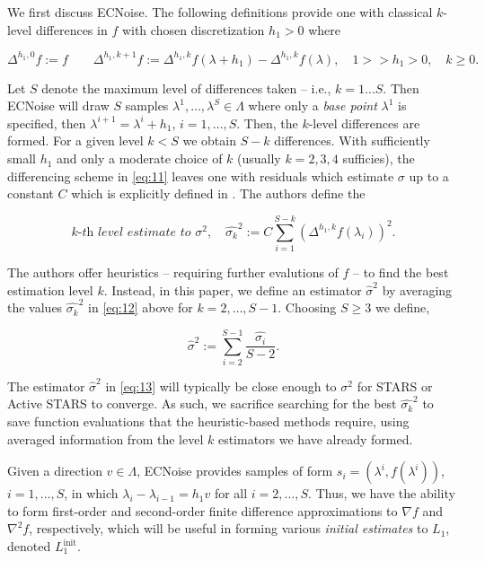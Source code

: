 \documentclass{amsart}
\begin{document}
We first discuss ECNoise. The following definitions provide one with classical $k$-level differences in $f$ with chosen discretization $h_1>0$ where

\begin{equation} \label{eq:13}
\Delta^{h_1,0} f :=f \quad \quad \Delta^{h_1,k+1} f:=\Delta^{h_1,k} f(\lambda+h_1)- \Delta^{h_1,k} f(\lambda), \quad 1>>h_1>0, \quad k \geq 0.
\end{equation}  

\noindent Let $S$ denote the maximum level of differences taken -- i.e., $k=1\ldots S$. Then ECNoise will draw $S$ samples $\lambda^1,\ldots,\lambda^S \in \Lambda$ where only a \textit{base point} $\lambda^1$ is specified, then $\lambda^{i+1}=\lambda^{i}+h_1$, $i=1,\ldots,S$. Then, the $k$-level differences are formed. For a given level $k< S$ we obtain $S-k$ differences. With sufficiently small $h_1$ and only a moderate choice of $k$ (usually $k=2,3,4$ sufficies), the differencing scheme in \eqref{eq:11} leaves one with residuals which estimate $\sigma$ up to a constant $C$ which is explicitly defined in \cite{MW}. The authors define the



\begin{equation} \label{eq:14}
\textit{$k$-th level estimate to $\sigma^2,$}\quad \hat{\sigma_k}^2:=C\sum_{i=1}^{S-k}\left(\Delta^{h_1,k}f(\lambda_i)\right)^2.
\end{equation}  

The authors offer heuristics -- requiring further evalutions of $f$ -- to find the best estimation level $k$. Instead, in this paper, we define an estimator $\hat{\sigma}^2$ by averaging the values $\hat{\sigma_k}^2$ in \eqref{eq:12} above for $k=2,\ldots,S-1.$ Choosing $S\geq 3$ we define,

\begin{equation} \label{eq:15}
 \hat{\sigma}^2:=\sum_{i=2}^{S-1}\frac{\hat{\sigma_i}}{S-2}.
\end{equation}  

The estimator $\hat{\sigma}^2$ in \eqref{eq:13} will typically be close enough to $\sigma^2$ for STARS or Active STARS to converge. As such, we sacrifice searching for the best $\hat{\sigma_k}^2$ to save function evaluations that the heuristic-based methods require, using averaged information from the level $k$ estimators we have already formed.

Given a direction $v \in \Lambda$, ECNoise provides samples of form $s_i=(\lambda^i, f(\lambda^i))$, $i=1,\ldots, S$, in which $\lambda_i-\lambda_{i-1}=h_1v$ for all $i=2,\ldots, S.$ Thus, we have the ability to form first-order and second-order finite difference approximations to $\nabla f$ and $\nabla^2 f$, respectively, which will be useful in forming various \textit{initial estimates} to $L_1$, denoted $L_1^\text{init}$. 
\end{document}
